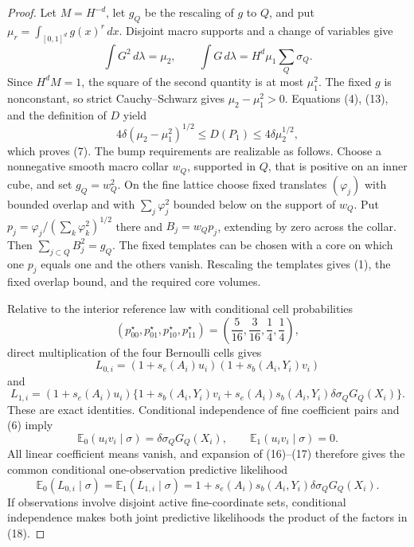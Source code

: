 \documentclass{article}
\begin{document}
\begin{proof}
Let \(M=H^{-d}\), let \(g_Q\) be the rescaling of \(g\) to \(Q\), and put \(\mu_r=\int_{[0,1]^d}g(x)^r\,dx\).  Disjoint macro supports and a change of variables give
\[
 \int G^2\,d\lambda=\mu_2,
 \qquad
 \int G\,d\lambda=H^d\mu_1\sum_Q\sigma_Q.
 \tag{13}
\]
Since \(H^dM=1\), the square of the second quantity is at most \(\mu_1^2\).  The fixed \(g\) is nonconstant, so strict Cauchy--Schwarz gives \(\mu_2-\mu_1^2>0\).  Equations (4), (13), and the definition of \(D\) yield
\[
 4\delta(\mu_2-\mu_1^2)^{1/2}
 \leq D(P_1)\leq4\delta\mu_2^{1/2},
 \tag{14}
\]
which proves (7).  The bump requirements are realizable as follows.  Choose a nonnegative smooth macro collar \(w_Q\), supported in \(Q\), that is positive on an inner cube, and set \(g_Q=w_Q^2\).  On the fine lattice choose fixed translates \((\varphi_j)\) with bounded overlap and with \(\sum_j\varphi_j^2\) bounded below on the support of \(w_Q\).  Put \(p_j=\varphi_j/(\sum_k\varphi_k^2)^{1/2}\) there and \(B_j=w_Qp_j\), extending by zero across the collar.  Then \(\sum_{j\subset Q}B_j^2=g_Q\).  The fixed templates can be chosen with a core on which one \(p_j\) equals one and the others vanish.  Rescaling the templates gives (1), the fixed overlap bound, and the required core volumes.

Relative to the interior reference law with conditional cell probabilities
\[
 (p^\star_{00},p^\star_{01},p^\star_{10},p^\star_{11})
 =\left(\frac5{16},\frac3{16},\frac14,\frac14\right),
 \tag{15}
\]
direct multiplication of the four Bernoulli cells gives
\[
 L_{0,i}=(1+s_e(A_i)u_i)(1+s_b(A_i,Y_i)v_i)
 \tag{16}
\]
and
\[
 L_{1,i}=(1+s_e(A_i)u_i)
 \{1+s_b(A_i,Y_i)v_i+s_e(A_i)s_b(A_i,Y_i)\delta\sigma_QG_Q(X_i)\}.
 \tag{17}
\]
These are exact identities.  Conditional independence of fine coefficient pairs and (6) imply
\[
 \mathbb E_0(u_iv_i\mid\sigma)=\delta\sigma_QG_Q(X_i),
 \qquad
 \mathbb E_1(u_iv_i\mid\sigma)=0.
\]
All linear coefficient means vanish, and expansion of (16)--(17) therefore gives the common conditional one-observation predictive likelihood
\[
 \mathbb E_0(L_{0,i}\mid\sigma)
 =\mathbb E_1(L_{1,i}\mid\sigma)
 =1+s_e(A_i)s_b(A_i,Y_i)\delta\sigma_QG_Q(X_i).
 \tag{18}
\]
If observations involve disjoint active fine-coordinate sets, conditional independence makes both joint predictive likelihoods the product of the factors in (18).


\end{proof}
\end{document}
